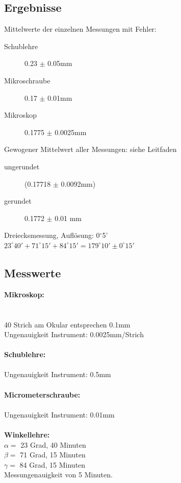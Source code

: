 \documentclass[12pt,a4paper]{article}
\begin{document}
\begin{multicols}{2}
\subsection{Ergebnisse}
Mittelwerte der einzelnen Messungen mit Fehler:
\begin{description}
	\item[Schublehre]  0.23 $\pm$ 0.05mm
	\item[Mikroschraube] 0.17 $\pm$ 0.01mm
	\item[Mikroskop] 0.1775 $\pm$ 0.0025mm
\end{description}
Gewogener Mittelwert aller Messungen: siehe Leitfaden
\begin{description}
				\item[ungerundet] (0.17718 $\pm$ 0.0092mm) 
				\item[gerundet] 0.1772 $\pm$ 0.01 mm
\end{description}
Dreiecksmessung, Auflösung: 0$^{\circ}$5'\\
$23^{\circ}40' + 71^{\circ}15' + 84^{\circ}15'=179^{\circ}10'\pm0^{\circ}15'$
\subsection{Messwerte}
\textbf{Mikroskop:}\\
\\
\\
40 Strich am Okular entsprechen 0.1mm\\
Ungenauigkeit Instrument: 0.0025mm/Strich\\
\\
\textbf{Schublehre:}\\
\\
Ungenauigkeit Instrument: 0.5mm\\
\\
\textbf{Micrometerschraube:}\\
\\
Ungenauigkeit Instrument: 0.01mm\\
\\
\textbf{Winkellehre:}\\
$\alpha = $ 23 Grad, 40 Minuten\\
$\beta =$ 71 Grad, 15 Minuten\\
$\gamma = $ 84 Grad, 15 Minuten\\
Messungenauigkeit von 5 Minuten.\\


\end{multicols}
\end{document}
